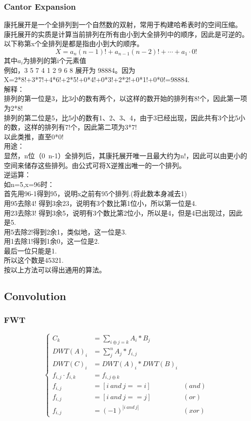 \documentclass[10pt]{ctexart}
\begin{document}
{{\subsubsection{Cantor Expansion}
康托展开是一个全排列到一个自然数的双射，常用于构建哈希表时的空间压缩。 康托展开的实质是计算当前排列在所有由小到大全排列中的顺序，因此是可逆的。
以下称第x个全排列是都是指由小到大的顺序。\\
$$
X = a_n(n-1)! + a_{n-1}(n-2)! + \cdots + a_1\cdot 0!
$$
其中$a_i$为排列的第i个元素值\\
例如，3 5 7 4 1 2 9 6 8 展开为 98884。因为X=2*8!+3*7!+4*6!+2*5!+0*4!+0*3!+2*2!+0*1!+0*0!=98884.\\
解释：\\
排列的第一位是3，比3小的数有两个，以这样的数开始的排列有8!个，因此第一项为2*8!\\
排列的第二位是5，比5小的数有1、2、3、4，由于3已经出现，因此共有3个比5小的数，这样的排列有7!个，因此第二项为3*7!\\
以此类推，直至0*0!\\
用途：\\
显然，n位（0~n-1）全排列后，其康托展开唯一且最大约为n!，因此可以由更小的空间来储存这些排列。由公式可将X逆推出唯一的一个排列。\\
逆运算：\\
如n=5,x=96时：\\
首先用96-1得到95，说明x之前有95个排列.(将此数本身减去1)\\
用95去除4! 得到3余23，说明有3个数比第1位小，所以第一位是4.\\
用23去除3! 得到3余5，说明有3个数比第2位小，所以是4，但是4已出现过，因此是5.\\
用5去除2!得到2余1，类似地，这一位是3.\\
用1去除1!得到1余0，这一位是2.\\
最后一位只能是1.\\
所以这个数是45321.\\
按以上方法可以得出通用的算法。\\
\subsection{Convolution}
\subsubsection{FWT}
\begin{equation*}
\left\{
    \begin{aligned}
        C_k&=\sum_{i\oplus j=k}A_i*B_j \\
        DWT(A)_i&=\sum_j^nA_j*f_{i,j} \\
        DWT(C)_i&=DWT(A)_i*DWT(B)_i\\
        f_{i,j} \cdot f_{i,k} &=f_{i,j\oplus k}\\
        f_{i,j} &= [i \ and \ j == i] \  &(and)\\
        f_{i,j} &= [i \  and \  j == j] \ &(or)\\
        f_{i,j} &= (-1)^{| i \  and \  j |} \ &(xor)
    \end{aligned}
\right.
\end{equation*}
}}
\end{document}
